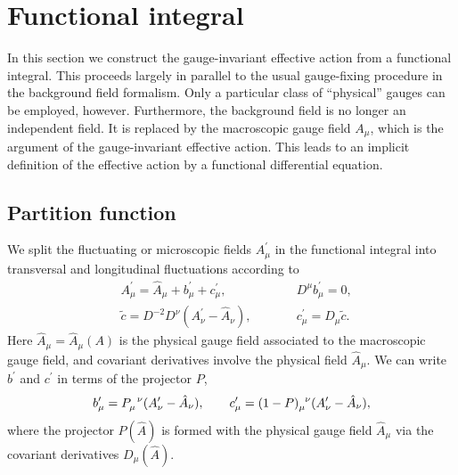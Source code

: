 \documentclass[twocolumn,aps,prd,amsmath,amssymb,preprintnumbers,longbibliography]{revtex4-1}
\numberwithin{equation}{section}
\newenvironment{alignedeqn}{\begin{equation}\begin{aligned}}{\end{aligned}\end{equation}\ignorespacesafterend}
\begin{document}
\section{Functional integral}
\label{sec:functional integral}

In this section we construct the gauge-invariant effective action from a functional integral. This proceeds largely in parallel to the usual gauge-fixing procedure in the background field formalism. Only a particular class of ``physical'' gauges can be employed, however. Furthermore, the background field is no longer an independent field. It is replaced by the macroscopic gauge field $A_\mu$, which is the argument of the gauge-invariant effective action. This leads to an implicit definition of the effective action by a functional differential equation.


\subsection{Partition function}

We split the fluctuating or microscopic fields $A_\mu^\prime$ in the functional integral into transversal and longitudinal fluctuations according to
\begin{alignedeqn}\label{eqn:G4}
	&A_\mu^\prime
	= \hat{A}_\mu + b^\prime_\mu + c^\prime_\mu,
	&&D^\mu b^\prime_\mu
	= 0,\\
	&\tilde{c}
	= D^{-2}D^\nu (A_\nu^\prime - \hat{A}_\nu),
	\qquad
	&&c^\prime_\mu
	= D_\mu \tilde{c}.
\end{alignedeqn}
Here $\hat{A}_\mu = \hat{A}_\mu(A)$ is the physical gauge field associated to the macroscopic gauge field, and covariant derivatives involve the physical field $\hat{A}_\mu$. We can write $b^\prime$ and $c^\prime$ in terms of the projector $P$,
\begin{equation}\label{eqn:G5}
	b^\prime_\mu
	= \tensor{P}{_\mu^\nu} (A_\nu^\prime - \hat{A}_\nu),
	\qquad
	c^\prime_\mu
	= \tensor{(1 - P)}{_\mu^\nu} (A_\nu^\prime - \hat{A}_\nu),
\end{equation}
where the projector $P(\hat{A})$ is formed with the physical gauge field $\hat{A}_\mu$ via the covariant derivatives $D_\mu(\hat{A})$.
\end{document}
